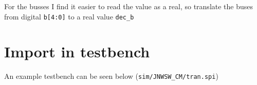 \begin{Shaded}
\begin{Highlighting}[]
\ExtensionTok{*}

\ExtensionTok{*}
\end{Highlighting}
\end{Shaded}

For the busses I find it easier to read the value as a real, so
translate the buses from digital \texttt{b{[}4:0{]}} to a real value
\texttt{dec\_b}

\begin{Shaded}
\begin{Highlighting}[]
\ErrorTok{(}  
\ExtensionTok{+}\PreprocessorTok{*}\ErrorTok{(}\KeywordTok{)}
\ExtensionTok{+}\PreprocessorTok{*}\ErrorTok{(}\KeywordTok{)}
\ExtensionTok{+}\PreprocessorTok{*}\ErrorTok{(}\KeywordTok{)}
\ExtensionTok{+}\PreprocessorTok{*}\ErrorTok{(}\KeywordTok{)}
\ExtensionTok{+}\PreprocessorTok{*}\ErrorTok{(}\KeywordTok{)}
\ExtensionTok{+}\KeywordTok{)}
\ErrorTok{(}\KeywordTok{)}
\end{Highlighting}
\end{Shaded}

\section{Import in testbench}\label{import-in-testbench}

An example testbench can be seen below (\texttt{sim/JNWSW\_CM/tran.spi})

